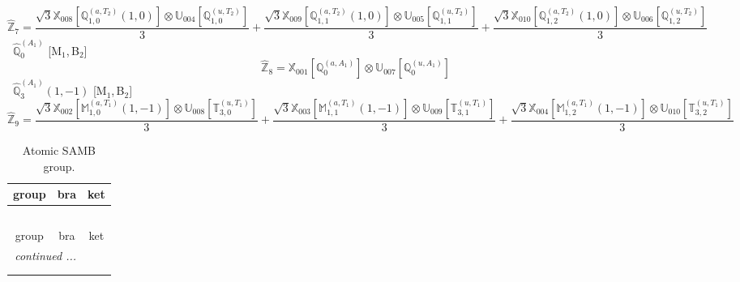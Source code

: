 \documentclass[fleqn,10pt,landscape]{article}
\begin{document}
\begin{itemize}
\begin{dmath*}
\hat{\mathbb{Z}}_{7}=\frac{\sqrt{3} \mathbb{X}_{008}[\mathbb{Q}_{1,0}^{(a,T_{2})}(1,0)] \otimes\mathbb{U}_{004}[\mathbb{Q}_{1,0}^{(u,T_{2})}]}{3} + \frac{\sqrt{3} \mathbb{X}_{009}[\mathbb{Q}_{1,1}^{(a,T_{2})}(1,0)] \otimes\mathbb{U}_{005}[\mathbb{Q}_{1,1}^{(u,T_{2})}]}{3} + \frac{\sqrt{3} \mathbb{X}_{010}[\mathbb{Q}_{1,2}^{(a,T_{2})}(1,0)] \otimes\mathbb{U}_{006}[\mathbb{Q}_{1,2}^{(u,T_{2})}]}{3}
\end{dmath*}
\vspace{4mm}
\noindent {} $\,\,\,\hat{\mathbb{Q}}_{0}^{(A_{1})}$ [M$_{1}$,\,B$_{2}$]
\begin{dmath*}
\hat{\mathbb{Z}}_{8}=\mathbb{X}_{001}[\mathbb{Q}_{0}^{(a,A_{1})}] \otimes\mathbb{U}_{007}[\mathbb{Q}_{0}^{(u,A_{1})}]
\end{dmath*}
\vspace{4mm}
\noindent {} $\,\,\,\hat{\mathbb{Q}}_{3}^{(A_{1})}(1,-1)$ [M$_{1}$,\,B$_{2}$]
\begin{dmath*}
\hat{\mathbb{Z}}_{9}=\frac{\sqrt{3} \mathbb{X}_{002}[\mathbb{M}_{1,0}^{(a,T_{1})}(1,-1)] \otimes\mathbb{U}_{008}[\mathbb{T}_{3,0}^{(u,T_{1})}]}{3} + \frac{\sqrt{3} \mathbb{X}_{003}[\mathbb{M}_{1,1}^{(a,T_{1})}(1,-1)] \otimes\mathbb{U}_{009}[\mathbb{T}_{3,1}^{(u,T_{1})}]}{3} + \frac{\sqrt{3} \mathbb{X}_{004}[\mathbb{M}_{1,2}^{(a,T_{1})}(1,-1)] \otimes\mathbb{U}_{010}[\mathbb{T}_{3,2}^{(u,T_{1})}]}{3}
\end{dmath*}
\begin{center}
\renewcommand{\arraystretch}{1.3}
\begin{longtable}{c|c|c}
\caption{Atomic SAMB group.}
 \\
 \hline \hline
group & bra & ket \\ \hline \endfirsthead

\multicolumn{2}{l}{\tablename\ \thetable{}} \\
 \hline \hline
group & bra & ket \\ \hline \endhead

 \hline \hline
\multicolumn{2}{r}{\footnotesize\it continued ...} \\ \endfoot

 \hline \hline
\multicolumn{2}{r}{} \\ \endlastfoot


\end{longtable}
\end{center}
\end{itemize}
\end{document}
